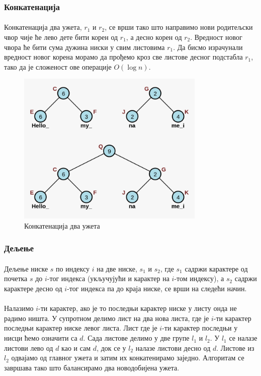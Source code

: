 \documentclass[12pt,oneside]{memoir}
\begin{document}
\subsubsection{Конкатенација}
\paragraph{}
Конкатенација два ужета, \(r_1\) и \(r_2\), се врши тако што направимо нови родитељски чвор
чије ће лево дете бити корен од \(r_1\), а десно корен од  \(r_2\). Вредност новог чвора ће
бити сума дужина ниски у свим листовима \(r_1\). Да бисмо израчунали вредност новог корена
морамо да прођемо кроз све листове десног подстабла \(r_1\), тако да је сложеност ове 
операције \(O(\log{}n)\).

\begin{figure}
  \centering
  \includegraphics[width=0.8\textwidth]{images/rope_concat.png}
  \caption{Конкатенација два ужета}
  \label{fig:ropeconcat}
\end{figure}

\subsubsection{Дељење}
\paragraph{}
Дељење ниске \(s\) по индексу \(i\) на две ниске, \(s_1\) и \(s_2\),
где \(s_1\) садржи карактере од почетка  \(s\) до \(i\)-тог индекса (укључујући и карактер на 
\(i\)-том индексу), а \(s_2\) садржи карактере десно од \(i\)-тог индекса па до краја ниске,
се врши на следећи начин.

\paragraph{}
Налазимо \(i\)-ти карактер, ако је то последњи карактер ниске у листу онда не радимо ништа.
У супротном делимо лист на два нова листа, где је \(i\)-ти карактер последњи карактер ниске
левог листа. Лист где је \(i\)-ти карактер последњи у нисци ћемо означити са \(d\). Сада
листове делимо у две групе \(l_1\)  и \(l_2\). У \(l_1\) се налазе листови лево од \(d\) као и сам \(d\), док се у \(l_2\) налазе листови десно од \(d\). Листове из \(l_2\) одвајамо од 
главног ужета и затим их конкатенирамо заједно. Алгоритам се завршава тако што балансирамо 
два новодобијена ужета.
\end{document}
